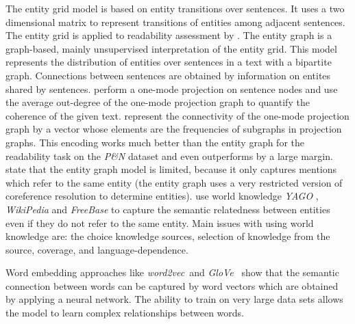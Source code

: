 The entity grid model \cite{barzilay08} is based on entity transitions
over sentences. It uses a two dimensional matrix to represent
transitions of entities among adjacent sentences. The entity grid is
applied to readability assessment by . The entity
graph \cite{guinaudeau13} is a graph-based, mainly unsupervised
interpretation of the entity grid. This model represents the
distribution of entities over sentences in a text with a bipartite
graph. Connections between sentences are obtained by information on
entites shared by sentences.  perform a one-mode
projection on sentence nodes and use the average out-degree of
the one-mode projection graph to quantify the coherence of the given
text.  represent the connectivity of the one-mode
projection graph by a vector whose elements are the frequencies of
subgraphs in projection graphs. This encoding works much better
than the entity graph for the readability task on the \emph{P\&N}
dataset and even outperforms  by a large margin.
 state that the entity graph model is limited,
because it only captures mentions which refer to the same entity (the
entity graph uses a very restricted version of coreference resolution
to determine entities).  use world knowledge
\emph{YAGO} \cite{hoffart13}, \emph{WikiPedia} \cite{denoyer06} and
\emph{FreeBase} \cite{bollacker08} to capture the semantic relatedness
between entities even if they do not refer to the same entity. Main
issues with using world knowledge are: the choice knowledge sources, selection of knowledge from the source, coverage, and language-dependence.

Word embedding approaches like \emph{word2vec}\ and \emph{GloVe}\
\cite{mikolov13c,pennington14} show that the semantic connection
between words can be captured by word vectors which are obtained by
applying a neural network. The ability to train on very
large data sets allows the model to learn complex relationships
between words.


